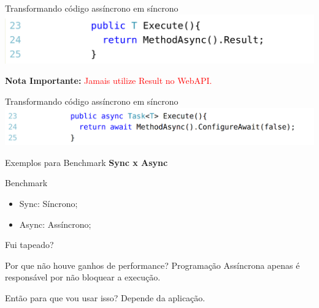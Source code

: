 \documentclass[10pt]{beamer}
\begin{document}
\begin{frame}{Transformando código assíncrono em síncrono}
	\includegraphics[scale=0.22]{imgs/03-asyncToSync2.png}
	\vspace{0.5cm}
	
	\textbf{Nota Importante:} \textcolor{red}{Jamais utilize Result no WebAPI.}
\end{frame}

\begin{frame}{Transformando código assíncrono em síncrono}
	\includegraphics[scale=0.27]{imgs/03-asyncToSync3.png}
\end{frame}

\begin{frame}{Exemplos para Benchmark}
	\textbf{Sync x Async}
\end{frame}

\begin{frame}{Benchmark}
	\begin{figure}
	\end{figure}
	\vspace{-0.5cm}
	\scriptsize
	\begin{itemize}
		\item Sync: Síncrono;
		\item Async: Assíncrono;
	\end{itemize}
\end{frame}

\begin{frame}{Fui tapeado?}
	\begin{alertblock}{Por que não houve ganhos de performance?}
		Programação Assíncrona apenas é responsável por não bloquear a execução.
	\end{alertblock}
	\vspace{0.2cm}
	\begin{exampleblock}{Então para que vou usar isso?}
		Depende da aplicação.
	\end{exampleblock}
\end{frame}
\end{document}

